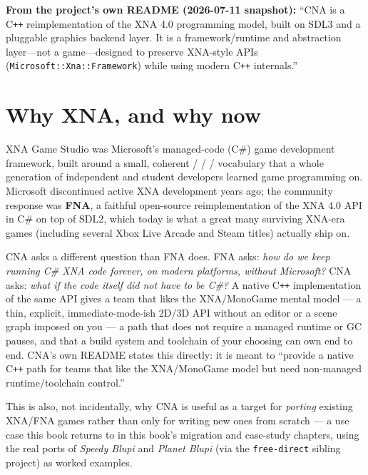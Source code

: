 \begin{sourcenote}
\textbf{From the project's own README (2026-07-11 snapshot):} ``CNA is a C\texttt{++}
reimplementation of the XNA 4.0 programming model, built on SDL3 and a pluggable graphics
backend layer. It is a framework/runtime and abstraction layer---not a game---designed to
preserve XNA-style APIs (\texttt{Microsoft::Xna::Framework}) while using modern C\texttt{++}
internals.''
\end{sourcenote}

\section{Why XNA, and why now}

XNA Game Studio was Microsoft's managed-code (C\#) game development framework, built around
a small, coherent  /  /  / 
vocabulary that a whole generation of independent and student developers learned game
programming on. Microsoft discontinued active XNA development years ago; the community
response was \textbf{FNA}, a faithful open-source reimplementation of the XNA 4.0 API in
C\# on top of SDL2, which today is what a great many surviving XNA-era games (including
several Xbox Live Arcade and Steam titles) actually ship on.

CNA asks a different question than FNA does. FNA asks: \emph{how do we keep running C\#
XNA code forever, on modern platforms, without Microsoft?} CNA asks: \emph{what if the code
itself did not have to be C\#?} A native C\texttt{++} implementation of the same API gives a
team that likes the XNA/MonoGame mental model --- a thin, explicit, immediate-mode-ish 2D/3D
API without an editor or a scene graph imposed on you --- a path that does not require a
managed runtime or GC pauses, and that a build system and toolchain of your choosing can
own end to end. CNA's own README states this directly: it is meant to ``provide a native
C\texttt{++} path for teams that like the XNA/MonoGame model but need non-managed
runtime/toolchain control.''

This is also, not incidentally, why CNA is useful as a target for \emph{porting} existing
XNA/FNA games rather than only for writing new ones from scratch --- a use case this book
returns to in this book's migration and case-study chapters, using the real ports of
\emph{Speedy Blupi} and \emph{Planet Blupi} (via the \texttt{free-direct} sibling project)
as worked examples.

